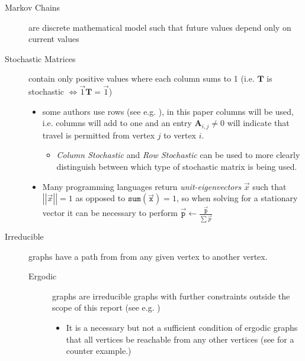 \documentclass[11pt]{article}
\begin{document}
\begin{description}
\item[{Markov Chains}] are discrete mathematical model such that future values depend only on current values \cite[]{foussAlgorithmsModelsNetwork2016}
\item[{Stochastic Matrices}] contain only positive values where each column sums to 1 \cite{langvilleGooglePageRankScience2012,larsonElementaryLinearAlgebra1991} (i.e. \(\mathbf{T}\) is stochastic \(\iff \vec{1}\mathbf{T} = \vec{1}\))
\begin{itemize}
\item some authors use rows (see e.g. \cite[]{langvilleGooglePageRankScience2012}), in this paper columns will be used, i.e. columns will add to one and an entry \(\mathbf{A}_{i,j} \neq 0\) will indicate that travel is permitted from vertex \(j\) to vertex \(i\).
\begin{itemize}
\item \emph{Column Stochastic} and \emph{Row Stochastic} can be used to more clearly distinguish between which type of stochastic matrix is being used.
\end{itemize}
\item Many programming languages return \emph{unit-eigenvectors} \(\vec{x}\) such that \(\left\lvert \left\lvert \vec{x} \right\rvert \right\rvert = 1\) as opposed to \(\mathtt{sum} \left( \vec{\mathtt{x}}\right) = 1\), so when solving for a stationary vector it can be necessary to perform \(\vec{\mathtt{p}} \leftarrow \frac{\vec{\mathtt{p}}}{\sum \vec{p}}\)
\end{itemize}
\item[{Irreducible}] graphs have a path from from any given vertex to another vertex. \cite[]{langvilleGooglePageRankScience2012}
\begin{description}
\item[{Ergodic}] graphs are irreducible graphs with further constraints outside
the scope of this report (see e.g.
\cite{nathanaelackermancameronfreeralexkruckmanandrehanapatelProperlyErodicStructures2017,chenEigenvaluesInequalitiesErgodic2005})
\begin{itemize}
\item It is a necessary but not a sufficient condition of ergodic graphs that all vertices be reachable from any other vertices (see \cite{sazProbabilityTheoryThis} for a counter example.)
\end{itemize}
\end{description}

\end{description}
\end{document}
